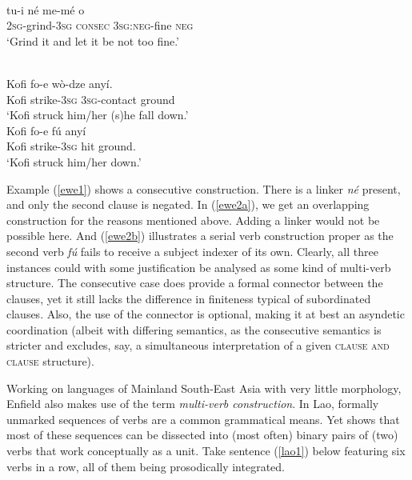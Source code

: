 \ea \label{ewe1} 
\\
\gll tu-i né me-mé o \\
\textsc{2}\textsc{sg}-grind-\textsc{3}\textsc{sg} \textsc{consec} \textsc{3}\textsc{sg}:\textsc{neg}-fine \textsc{neg} \\
\glft `Grind it and let it be not too fine.'\\ 
\z

\ea 
{}\\
\ea \label{ewe2a}
\gll Kofi fo-e wò-dze anyí. \\
Kofi strike-\textsc{3}\textsc{sg} \textsc{3}\textsc{sg}-contact ground \\
\glft `Kofi struck him/her (s)he fall down.' \\ 
\ex \label{ewe2b}
\gll Kofi fo-e fú anyí \\ 
Kofi strike-\textsc{3}\textsc{sg} hit ground. \\
\glft `Kofi struck him/her down.'\\ 
\z
\z

Example (\ref{ewe1}) shows a consecutive construction. There is a linker \textit{né} present, and only the second clause is negated. In (\ref{ewe2a}), we get an overlapping construction for the reasons mentioned above. Adding a linker would not be possible here. And (\ref{ewe2b}) illustrates a serial verb construction proper as the second verb \textit{fú} fails to receive a subject indexer of its own. Clearly, all three instances could with some justification be analysed as some kind of multi-verb structure. The consecutive case does provide a formal connector between the clauses, yet it still lacks the difference in finiteness typical of subordinated clauses. Also, the use of the connector is optional, making it at best an asyndetic coordination (albeit with differing semantics, as the consecutive semantics is stricter and excludes, say, a simultaneous interpretation of a given \textsc{clause and clause} structure). 

Working on languages of Mainland South-East Asia with very little morphology, Enfield also makes use of the term \textit{multi-verb construction}. In Lao, formally unmarked sequences of verbs are a common grammatical means. Yet \citet{enfield2008verbs} shows that most of these sequences can be dissected into (most often) binary pairs of (two) verbs that work conceptually as a unit. Take sentence (\ref{lao1}) below featuring six verbs in a row, all of them being prosodically integrated.

